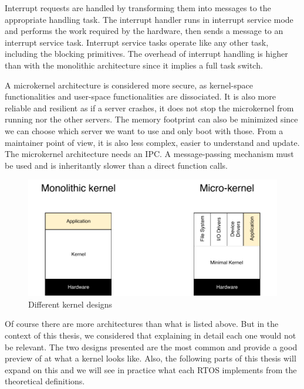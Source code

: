 Interrupt requests are handled by transforming them into messages to the appropriate handling task.
The interrupt handler runs in interrupt service mode and performs the work required by the hardware, then sends a message to an interrupt service task.
Interrupt service tasks operate like any other task, including the blocking primitives.
The overhead of interrupt handling is higher than with the monolithic architecture since it implies a full task switch.

A microkernel architecture is considered more secure, as kernel-space functionalities and user-space functionalities are dissociated.
It is also more reliable and resilient as if a server crashes, it does not stop the microkernel from running nor the other servers.
The memory footprint can also be minimized since we can choose which server we want to use and only boot with those.
From a maintainer point of view, it is also less complex, easier to understand and update.
The microkernel architecture needs an IPC.
A message-passing mechanism must be used and is inheritantly slower than a direct function calls.
\\

\begin{figure}[!h]
    \centering
    \includegraphics[scale=0.7]{assets/kernel_types.pdf}
    \caption{\label{fig:kernel-types}Different kernel designs}
\end{figure}

Of course there are more architectures than what is listed above.
But in the context of this thesis, we considered that explaining in detail each one would not be relevant.
The two designs presented are the most common and provide a good preview of at what a kernel looks like.
Also, the following parts of this thesis will expand on this
    and we will see in practice what each RTOS implements from the theoretical definitions.
